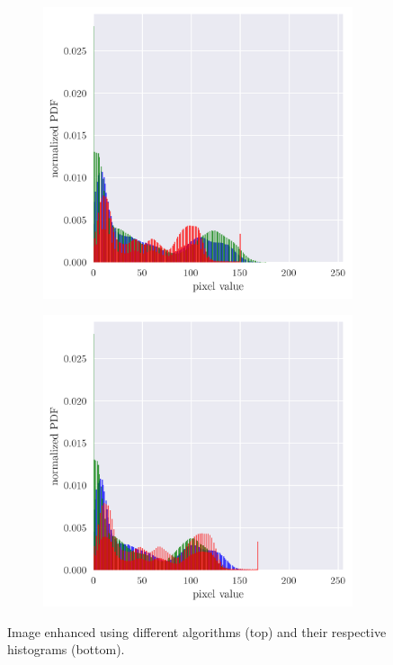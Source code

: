 \documentclass[12pt,a4paper]{article}
\begin{document}
\begin{figure}[htb]
\begin{subfigure}[h!]{0.24\textwidth}
		\caption{}
		\label{fig:cs-hist}
	\end{subfigure}
	\begin{subfigure}[h!]{0.24\textwidth}
		\centering
		\includegraphics[width=\textwidth]{gw_hist.png}
		\caption{}
		\label{fig:gw-hist}
	\end{subfigure}
	\begin{subfigure}[h!]{0.24\textwidth}
		\centering
		\includegraphics[width=\textwidth]{wp_hist.png}
		\caption{}
		\label{fig:wp-hist}
	\end{subfigure}
	
	\caption{Image enhanced using different algorithms (top) and their respective histograms (bottom).}
	\label{fig:manip}
\end{figure}
\end{document}
